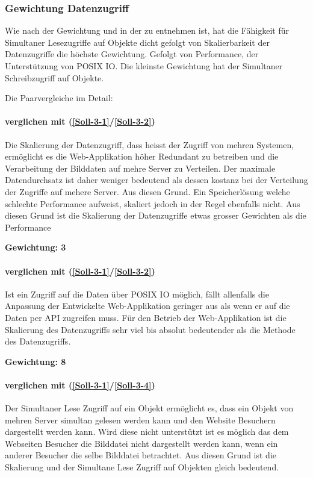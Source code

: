 \subsubsection{Gewichtung Datenzugriff}

Wie nach der Gewichtung und in der  zu entnehmen ist, hat die Fähigkeit für Simultaner Lesezugriffe auf Objekte dicht gefolgt von Skalierbarkeit der Datenzugriffe die höchste Gewichtung. Gefolgt von Performance, der Unterstützung von POSIX IO. Die kleinste Gewichtung hat der Simultaner Schreibzugriff auf Objekte.


Die Paarvergleiche im Detail:

\paragraph*{ verglichen mit  (\ref{Soll-3-1}/\ref{Soll-3-2})}
Die Skalierung der Datenzugriff, dass heisst der Zugriff von mehren Systemen, ermöglicht es die Web-Applikation höher Redundant zu betreiben und die Verarbeitung der Bilddaten auf mehre Server zu Verteilen. Der maximale Datendurchsatz ist daher weniger bedeutend als dessen kostanz bei der Verteilung der Zugriffe auf mehere Server. Aus diesen Grund. Ein Speicherlösung welche schlechte Performance aufweist, skaliert jedoch in der Regel ebenfalls nicht. Aus diesen Grund ist die Skalierung der Datenzugriffe etwas grosser Gewichten als die Performance 

\textbf{Gewichtung: 3}

\paragraph*{ verglichen mit  (\ref{Soll-3-1}/\ref{Soll-3-2})}
Ist ein Zugriff auf die Daten über POSIX IO möglich, fällt allenfalls die Anpassung der Entwickelte Web-Applikation geringer aus als wenn er auf die Daten per API zugreifen muss. Für den Betrieb der Web-Applikation ist die Skalierung des Datenzugriffs sehr viel bis absolut bedeutender als die Methode des Datenzugriffs.

\textbf{Gewichtung: 8}


\paragraph*{ verglichen mit  (\ref{Soll-3-1}/\ref{Soll-3-4})}
Der Simultaner Lese Zugriff auf ein Objekt ermöglicht es, dass ein Objekt von mehren Server simultan gelesen werden kann und den Website Besuchern dargestellt werden kann. Wird diese nicht unterstützt ist es möglich das dem Webseiten Besucher die Bilddatei nicht dargestellt werden kann, wenn ein anderer Besucher die selbe Bilddatei betrachtet. Aus diesen Grund ist die Skalierung und der Simultane Lese Zugriff auf Objekten gleich bedeutend.

